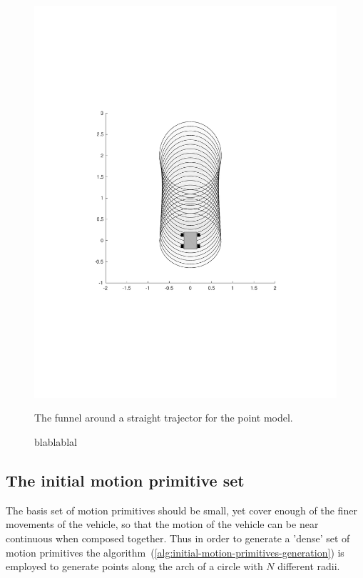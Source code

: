 \begin{figure}
\begin{minipage}{0.4\textwidth}
    \includegraphics[scale=.3]{figures/method/expanded-funnel-with-car}
    \caption{The funnel around a straight trajector for the point model.}
  \end{minipage}
  \caption{blablablal}
  \label{fig:expanded-and-unexpanded}
\end{figure}

\subsection{The initial motion primitive set}

The basis set of motion primitives should be small, yet cover enough of the
finer movements of the vehicle, so that the motion of the vehicle can be near
continuous when composed together. Thus in order to generate a 'dense' set of
motion primitives the algorithm~(\ref{alg:initial-motion-primitives-generation})
is employed to generate points along the arch of a circle with \(N\) different
radii.


